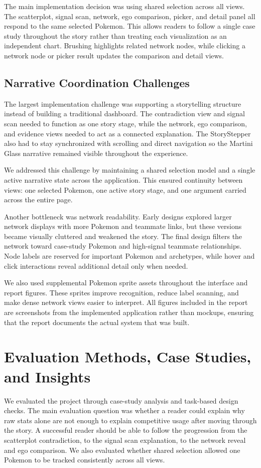 \documentclass[11pt]{article}
\newcommand{\tightsection}[1]{\vspace{-0.25em}\section{#1}\vspace{-0.25em}}
\begin{document}
The main implementation decision was using shared selection across all views. The scatterplot, signal scan, network, ego comparison, picker, and detail panel all respond to the same selected Pokemon. This allows readers to follow a single case study throughout the story rather than treating each visualization as an independent chart. Brushing highlights related network nodes, while clicking a network node or picker result updates the comparison and detail views.

\subsection*{Narrative Coordination Challenges}
The largest implementation challenge was supporting a storytelling structure instead of building a traditional dashboard. The contradiction view and signal scan needed to function as one story stage, while the network, ego comparison, and evidence views needed to act as a connected explanation. The StoryStepper also had to stay synchronized with scrolling and direct navigation so the Martini Glass narrative remained visible throughout the experience.

We addressed this challenge by maintaining a shared selection model and a single active narrative state across the application. This ensured continuity between views: one selected Pokemon, one active story stage, and one argument carried across the entire page.

Another bottleneck was network readability. Early designs explored larger network displays with more Pokemon and teammate links, but these versions became visually cluttered and weakened the story. The final design filters the network toward case-study Pokemon and high-signal teammate relationships. Node labels are reserved for important Pokemon and archetypes, while hover and click interactions reveal additional detail only when needed.

We also used supplemental Pokemon sprite assets throughout the interface and report figures. These sprites improve recognition, reduce label scanning, and make dense network views easier to interpret. All figures included in the report are screenshots from the implemented application rather than mockups, ensuring that the report documents the actual system that was built.

\tightsection{Evaluation Methods, Case Studies, and Insights}
We evaluated the project through case-study analysis and task-based design checks. The main evaluation question was whether a reader could explain why raw stats alone are not enough to explain competitive usage after moving through the story. A successful reader should be able to follow the progression from the scatterplot contradiction, to the signal scan explanation, to the network reveal and ego comparison. We also evaluated whether shared selection allowed one Pokemon to be tracked consistently across all views.
\end{document}
